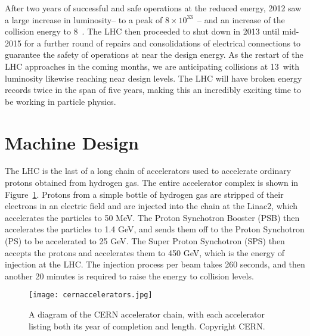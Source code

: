 After two years of successful and safe operations at the reduced energy, 2012 saw a large increase in luminosity-- to a peak of $8\times10^{33}$~\lumirate-- and an increase of the collision energy to 8~\TeV. The LHC then proceeded to shut down in 2013 until mid-2015 for a further round of repairs and consolidations of electrical connections to guarantee the safety of operations at near the design energy. As the restart of the LHC approaches in the coming months, we are anticipating collisions at 13~\TeV with luminosity likewise reaching near design levels. The LHC will have broken energy records twice in the span of five years, making this an incredibly exciting time to be working in particle physics.


\section{Machine Design}

The LHC is the last of a long chain of accelerators used to accelerate ordinary protons obtained from hydrogen gas\cite{cern-accelerators}. The entire accelerator complex is shown in Figure~\ref{fig:lhc:cern-accelerators}. Protons from a simple bottle of hydrogen gas are stripped of their electrons in an electric field and are injected into the chain at the Linac2, which accelerates the particles to 50 MeV. The Proton Synchotron Booster (PSB) then accelerates the particles to 1.4 GeV, and sends them off to the Proton Synchotron (PS) to be accelerated to 25 GeV. The Super Proton Synchotron (SPS) then accepts the protons and accelerates them to 450 GeV, which is the energy of injection at the LHC. The injection process per beam takes 260 seconds, and then another 20 minutes is required to raise the energy to collision levels.


\begin{figure}
\centering
\texttt{[image: cernaccelerators.jpg]}
\label{fig:lhc:cern-accelerators}
\caption{A diagram of the CERN accelerator chain, with each accelerator listing both its year of completion and length. Copyright CERN.}
\end{figure}


